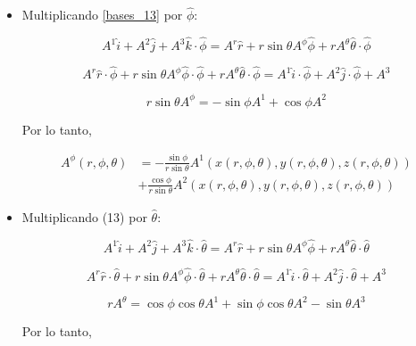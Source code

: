 \documentclass[../apunte_mecanica_clasica.tex]{subfiles}%
\begin{document}
\begin{itemize}
\item Multiplicando \eqref{bases_13} por $\hat{\phi}$:

\begin{equation*}
A^1 \hat{i} + A^2 \hat{j} + A^3 \hat{k} \cdot \hat{\phi} = A^r \hat{r} + r \sin\theta A^\phi \hat{\phi} + r A^\theta \hat{\theta} \cdot \hat{\phi}
\end{equation*}

\begin{equation*}
A^r \hat{r} \cdot \hat{\phi} + r \sin\theta A^\phi \hat{\phi} \cdot \hat{\phi} + r A^\theta \hat{\theta} \cdot \hat{\phi} = A^1 \hat{i} \cdot \hat{\phi} + A^2 \hat{j} \cdot \hat{\phi} + A^3
\end{equation*}

\begin{equation*}
r \sin\theta A^\phi = -\sin\phi A^1 + \cos\phi A^2
\end{equation*}

Por lo tanto,

\begin{equation*}
\begin{aligned}
A^\phi(r, \phi, \theta) &= - \frac{\sin\phi}{r \sin\theta} A^1(x(r, \phi, \theta), y(r, \phi, \theta), z(r, \phi, \theta)) \\ 
&+ \frac{\cos\phi}{r \sin\theta} A^2(x(r, \phi, \theta), y(r, \phi, \theta), z(r, \phi, \theta))    
\end{aligned}
\end{equation*}

\item Multiplicando (13) por $\hat{\theta}$:

\begin{equation*}
A^1 \hat{i} + A^2 \hat{j} + A^3 \hat{k} \cdot \hat{\theta} = A^r \hat{r} + r \sin\theta A^\phi \hat{\phi} + r A^\theta \hat{\theta} \cdot \hat{\theta}
\end{equation*}

\begin{equation*}
A^r \hat{r} \cdot \hat{\theta} + r \sin\theta A^\phi \hat{\phi} \cdot \hat{\theta} + r A^\theta \hat{\theta} \cdot \hat{\theta} = A^1 \hat{i} \cdot \hat{\theta} + A^2 \hat{j} \cdot \hat{\theta} + A^3
\end{equation*}

\begin{equation*}
r A^\theta = \cos\phi \cos\theta A^1 + \sin\phi \cos\theta A^2 - \sin\theta A^3
\end{equation*}

Por lo tanto,


\end{itemize}
\end{document}
